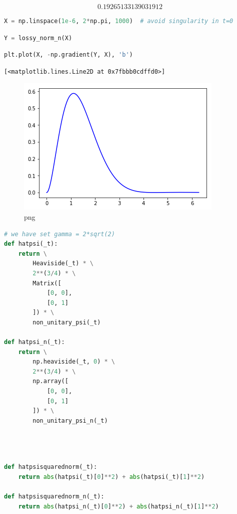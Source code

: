\[0.19265133139031912\]

\begin{lstlisting}[language=Python]
X = np.linspace(1e-6, 2*np.pi, 1000)  # avoid singularity in t=0
\end{lstlisting}

\begin{lstlisting}[language=Python]
Y = lossy_norm_n(X)
\end{lstlisting}

\begin{lstlisting}[language=Python]
plt.plot(X, -np.gradient(Y, X), 'b')
\end{lstlisting}

\begin{lstlisting}
[<matplotlib.lines.Line2D at 0x7fbbb0cdffd0>]
\end{lstlisting}

\begin{figure}
\centering
\includegraphics[width=0.66\linewidth]{output_45_1.png}
\caption{png}
\end{figure}

\begin{lstlisting}[language=Python]
# we have set gamma = 2*sqrt(2)
def hatpsi(_t):
    return \
        Heaviside(_t) * \
        2**(3/4) * \
        Matrix([
            [0, 0],
            [0, 1]
        ]) * \
        non_unitary_psi(_t)
        
def hatpsi_n(_t):
    return \
        np.heaviside(_t, 0) * \
        2**(3/4) * \
        np.array([
            [0, 0],
            [0, 1]
        ]) * \
        non_unitary_psi_n(_t)
        
        
    
\end{lstlisting}

\begin{lstlisting}[language=Python]
def hatpsisquarednorm(_t):
    return abs(hatpsi(_t)[0]**2) + abs(hatpsi(_t)[1]**2)

def hatpsisquarednorm_n(_t):
    return abs(hatpsi_n(_t)[0]**2) + abs(hatpsi_n(_t)[1]**2)
\end{lstlisting}


